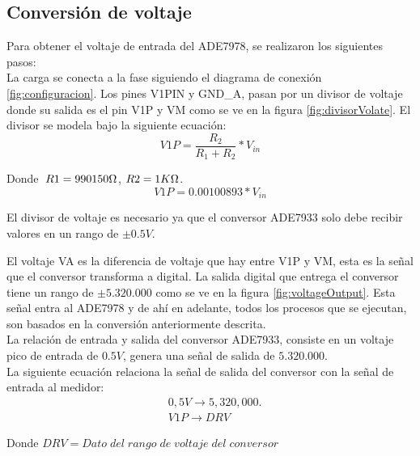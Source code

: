 \subsection{Conversión de voltaje}
Para obtener el voltaje de entrada del ADE7978, se realizaron los siguientes pasos:\\

La carga se conecta a la fase siguiendo el diagrama de conexión \ref{fig:configuracion}. Los pines V1PIN y GND\_A, pasan por un divisor de voltaje donde su salida es el pin V1P y VM como se ve en la figura \ref{fig:divisorVolate}. El divisor se modela bajo la siguiente ecuación:\\

\begin{equation}
    V1P = \frac{R_{2}}{R_{1} + R_{2}} * V_{in}
\end{equation}

Donde $\; R1 = 990150 \ohm$, \;$R2 = 1 K\ohm$.\\

\begin{equation}\label{divisorVoltaje}
    V1P = 0.00100893 * V_{in}
\end{equation}

El divisor de voltaje es necesario ya que el conversor ADE7933 solo debe recibir valores en un rango de $\pm 0.5V$. 

El voltaje VA es la diferencia de voltaje que hay entre V1P y VM, esta es la señal que el conversor transforma a digital. La salida digital que entrega el conversor tiene un rango de $\pm 5.320.000$ como se ve en la figura \ref{fig:voltageOutput}. Esta señal entra al ADE7978 y de ahí en adelante, todos los procesos que se ejecutan, son basados en la conversión anteriormente descrita.\\

La relación de entrada y salida del conversor ADE7933, consiste en un voltaje pico de entrada de $0.5 V$, genera una señal de salida de $5.320.000$.\\

La siguiente ecuación relaciona la señal de salida del conversor con la señal de entrada al medidor:\\

\begin{align*}
    &0,5V \rightarrow 5,320,000.\\
    &V1P \rightarrow DRV
\end{align*}

Donde $DRV = Dato\;del\;rango\;de\;voltaje\;del\;conversor$\\


